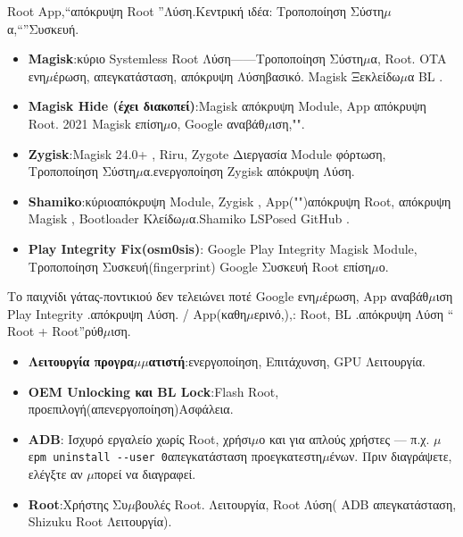 Root App,“απόκρυψη Root ”Λύση.Κεντρική ιδέα: Τροποποίηση Σύστη$\mu$α,“”Συσκευή.

\begin{itemize}
  \item \textbf{Magisk}:κύριο Systemless Root Λύση——Τροποποίηση Σύστη$\mu$α, Root. OTA ενη$\mu$έρωση, απεγκατάσταση, απόκρυψη Λύσηβασικό. Magisk Ξεκλείδω$\mu$α BL .
  \item \textbf{Magisk Hide (έχει διακοπεί)}:Magisk απόκρυψη Module, App απόκρυψη Root. 2021 Magisk επίση$\mu$ο, Google αναβάθ$\mu$ιση,"".
  \item \textbf{Zygisk}:Magisk 24.0+ , Riru, Zygote Διεργασία Module φόρτωση, Τροποποίηση Σύστη$\mu$α.ενεργοποίηση Zygisk απόκρυψη Λύση.
  \item \textbf{Shamiko}:κύριοαπόκρυψη Module, Zygisk , App("")απόκρυψη Root, απόκρυψη Magisk , Bootloader Κλείδω$\mu$α.Shamiko LSPosed GitHub .
  \item \textbf{Play Integrity Fix(osm0sis)}: Google Play Integrity Magisk Module, Τροποποίηση Συσκευή(fingerprint) Google Συσκευή Root επίση$\mu$ο.
\end{itemize}

\begin{tcbwarn}{Το παιχνίδι γάτας-ποντικιού δεν τελειώνει ποτέ}
Google ενη$\mu$έρωση, App αναβάθ$\mu$ιση Play Integrity .απόκρυψη Λύση. / App(καθη$\mu$ερινό,),: Root, BL .απόκρυψη Λύση “ Root + Root”ρύθ$\mu$ιση.

\end{tcbwarn}


\begin{itemize}
  \item \textbf{Λειτουργία προγρα$\mu$$\mu$ατιστή}:ενεργοποίηση, Επιτάχυνση, GPU Λειτουργία.
  \item \textbf{OEM Unlocking και BL Lock}:Flash Root, προεπιλογή(απενεργοποίηση)Ασφάλεια.
  \item \textbf{ADB}: Ισχυρό εργαλείο χωρίς Root, χρήσι$\mu$ο και για απλούς χρήστες — π.χ. $\mu$ε\texttt{pm uninstall -\allowbreak -\allowbreak user 0}απεγκατάσταση προεγκατεστη$\mu$ένων. Πριν διαγράψετε, ελέγξτε αν $\mu$πορεί να διαγραφεί.
  \item \textbf{Root}:Χρήστης Συ$\mu$βουλές Root. Λειτουργία, Root Λύση( ADB απεγκατάσταση, Shizuku Root Λειτουργία).
\end{itemize}

